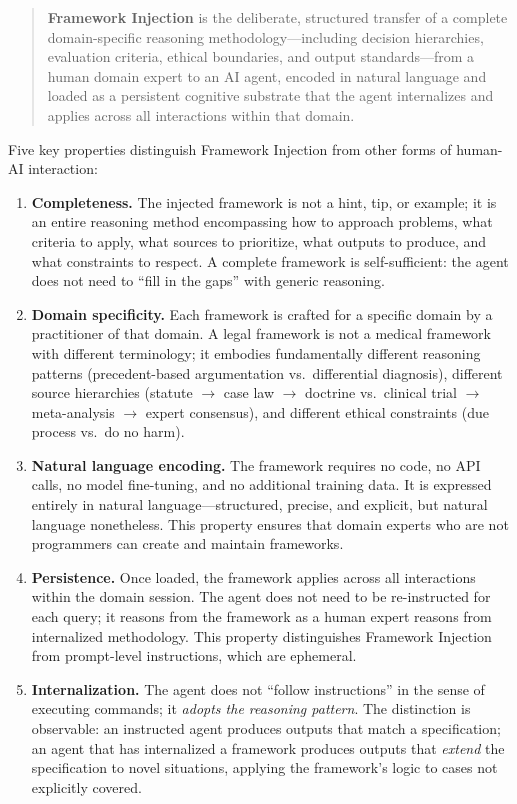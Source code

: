 \documentclass[12pt,a4paper]{article}
\begin{document}
\begin{quote}
\textbf{Framework Injection} is the deliberate, structured transfer of a complete domain-specific reasoning methodology---including decision hierarchies, evaluation criteria, ethical boundaries, and output standards---from a human domain expert to an AI agent, encoded in natural language and loaded as a persistent cognitive substrate that the agent internalizes and applies across all interactions within that domain.
\end{quote}

Five key properties distinguish Framework Injection from other forms of human-AI interaction:

\begin{enumerate}[label=\textbf{P\arabic*}.]
    \item \textbf{Completeness.} The injected framework is not a hint, tip, or example; it is an entire reasoning method encompassing how to approach problems, what criteria to apply, what sources to prioritize, what outputs to produce, and what constraints to respect. A complete framework is self-sufficient: the agent does not need to ``fill in the gaps'' with generic reasoning.

    \item \textbf{Domain specificity.} Each framework is crafted for a specific domain by a practitioner of that domain. A legal framework is not a medical framework with different terminology; it embodies fundamentally different reasoning patterns (precedent-based argumentation vs.\ differential diagnosis), different source hierarchies (statute $\rightarrow$ case law $\rightarrow$ doctrine vs.\ clinical trial $\rightarrow$ meta-analysis $\rightarrow$ expert consensus), and different ethical constraints (due process vs.\ do no harm).

    \item \textbf{Natural language encoding.} The framework requires no code, no API calls, no model fine-tuning, and no additional training data. It is expressed entirely in natural language---structured, precise, and explicit, but natural language nonetheless. This property ensures that domain experts who are not programmers can create and maintain frameworks.

    \item \textbf{Persistence.} Once loaded, the framework applies across all interactions within the domain session. The agent does not need to be re-instructed for each query; it reasons from the framework as a human expert reasons from internalized methodology. This property distinguishes Framework Injection from prompt-level instructions, which are ephemeral.

    \item \textbf{Internalization.} The agent does not ``follow instructions'' in the sense of executing commands; it \emph{adopts the reasoning pattern}. The distinction is observable: an instructed agent produces outputs that match a specification; an agent that has internalized a framework produces outputs that \emph{extend} the specification to novel situations, applying the framework's logic to cases not explicitly covered.
\end{enumerate}
\end{document}
